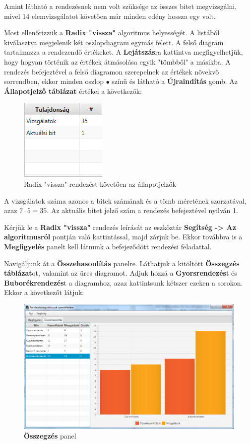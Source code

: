 \documentclass{elteikthesis}
\begin{document}
Amint látható a rendezésnek nem volt szüksége az összes bitet megvizsgálni, mivel 14 elemvizsgálatot követően már minden edény hossza egy volt. 
\par
Most ellenőrizzük a \textbf{Radix "vissza"} algoritmus helyességét. A listából kiválasztva megjelenik két oszlopdiagram egymás felett. A felső diagram tartalmazza a rendezendő értékeket. A \textbf{Lejátszás}ra kattintva megfigyelhetjük, hogy hogyan történik az értékek átmásolása egyik "tömbből" a másikba. A rendezés befejeztével a felső diagramon szerepelnek az értékek növekvő sorrendben, ekkor minden oszlop \textcolor{done}{\Huge$\bullet$} színű és látható a \textbf{Újraindítás} gomb. Az \textbf{Állapotjelző táblázat} értékei a következők:
\begin{figure}[H]
	\centering
	\includegraphics{pics/test/radixbackwardcounters.png}
	\caption{Radix "vissza" rendezést követően az állapotjelzők}
\end{figure}
A vizsgálatok száma azonos a bitek számának és a tömb méretének szorzatával, azaz $7\cdot 5 = 35$. Az aktuális bitet jelző szám a rendezés befejeztével nyilván 1.\par
Kérjük le a \textbf{Radix "vissza"} rendezés leírását az eszköztár \textbf{Segítség -> Az algoritmusról} pontján való kattintással, majd zárjuk be. Ekkor továbbra is a \textbf{Megfigyelés} panelt kell látnunk a befejeződött rendezési feladattal.\par
Navigáljunk át a \textbf{Összehasonlítás} panelre. Láthatjuk a kitöltött \textbf{Összegzés táblázat}ot, valamint az üres diagramot. Adjuk hozzá a \textbf{Gyorsrendezés}t és \textbf{Buborékrendezés}t a diagramhoz, azaz kattintsunk kétszer ezeken a sorokon. Ekkor a következőt látjuk:
\begin{figure}[H]
	\centering
	\includegraphics[width=\textwidth]{pics/test/benchmark.png}
	\caption{\textbf{Összegzés} panel}
\end{figure}
\end{document}
